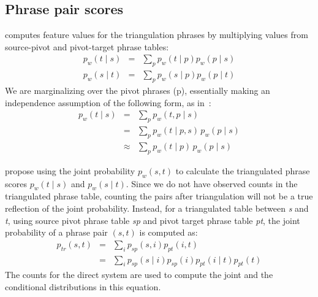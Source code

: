 \documentclass[11pt]{article}
\begin{document}
\subsection{Phrase pair scores}
\label{sec:phrase_scores}

 \cite{Utiyama:07} computes feature values for the triangulation phrases by multiplying values from source-pivot and pivot-target phrase tables:
	\begin{eqnarray} 
	    \label{eq:forward}
        p_w(t \mid s) &=& \sum_{p} p_w(t \mid p) p_w(p \mid s) \\
        \label{eq:backward}
        p_w(s \mid t) &=& \sum_{p} p_w(s \mid p) p_w(p \mid t)
	\end{eqnarray}
	We are marginalizing over the pivot phrases (p), essentially making an independence assumption of the following form, as in~\cite{Cohn:07}:  
	\begin{eqnarray*}
		p_w(t \mid s)&=&\sum_{p}{p_w(t, p \mid s)}\\
		&=& \sum_{p}{p_w(t \mid p, s)\,p_w(p \mid s)}\\
		&\approx& \sum_{p}{p_w(t \mid p)\,p_w(p \mid s)}
	\end{eqnarray*}

\label{sec:joint}
	\cite{Cohn:07} propose using the joint probability $p_{w}(s, t)$ to calculate the triangulated phrase scores $p_{w}(t \mid s)$ and $p_{w}(s \mid t)$. Since we do not have observed counts in the triangulated phrase table, counting the pairs after triangulation will not be a true reflection of the joint probability. Instead, for a triangulated table between \emph{s} and \emph{t}, using source pivot phrase table \emph{sp} and pivot target phrase table \emph{pt}, the joint probability of a phrase pair $(s, t)$ is computed as: 
	\begin{eqnarray*}
		p_{tr}(s, t) &=& \sum_{i}p_{sp}(s, i) p_{pt}(i, t) \\
				&=& \sum_{i}p_{sp}(s \mid i) p_{sp}(i) p_{pt}(i \mid t) p_{pt}(t)
	\end{eqnarray*} 
	The counts for the direct system are used to compute the joint and the conditional distributions in this equation.
	
\end{document}
